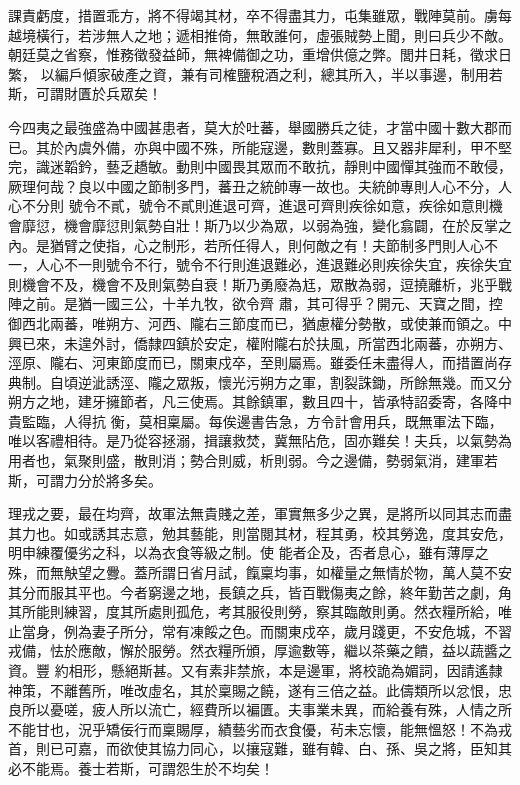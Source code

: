 \begin{pinyinscope}
 課責虧度，措置乖方，將不得竭其材，卒不得盡其力，屯集雖眾，戰陣莫前。虜每越境橫行，若涉無人之地；遞相推倚，無敢誰何，虛張賊勢上聞，則曰兵少不敵。朝廷莫之省察，惟務徵發益師，無裨備御之功，重增供億之弊。閭井日耗，徵求日繁，
 以編戶傾家破產之資，兼有司榷鹽稅酒之利，總其所入，半以事邊，制用若斯，可謂財匱於兵眾矣！



 今四夷之最強盛為中國甚患者，莫大於吐蕃，舉國勝兵之徒，才當中國十數大郡而已。其於內虞外備，亦與中國不殊，所能寇邊，數則蓋寡。且又器非犀利，甲不堅完，識迷韜鈐，藝乏趫敏。動則中國畏其眾而不敢抗，靜則中國憚其強而不敢侵，厥理何哉？良以中國之節制多門，蕃丑之統帥專一故也。夫統帥專則人心不分，人心不分則
 號令不貳，號令不貳則進退可齊，進退可齊則疾徐如意，疾徐如意則機會靡愆，機會靡愆則氣勢自壯！斯乃以少為眾，以弱為強，變化翕闢，在於反掌之內。是猶臂之使指，心之制形，若所任得人，則何敵之有！夫節制多門則人心不一，人心不一則號令不行，號令不行則進退難必，進退難必則疾徐失宜，疾徐失宜則機會不及，機會不及則氣勢自衰！斯乃勇廢為尪，眾散為弱，逗撓離析，兆乎戰陣之前。是猶一國三公，十羊九牧，欲令齊
 肅，其可得乎？開元、天寶之間，控御西北兩蕃，唯朔方、河西、隴右三節度而已，猶慮權分勢散，或使兼而領之。中興已來，未遑外討，僑隸四鎮於安定，權附隴右於扶風，所當西北兩蕃，亦朔方、涇原、隴右、河東節度而已，關東戍卒，至則屬焉。雖委任未盡得人，而措置尚存典制。自頃逆泚誘涇、隴之眾叛，懷光污朔方之軍，割裂誅鋤，所餘無幾。而又分朔方之地，建牙擁節者，凡三使焉。其餘鎮軍，數且四十，皆承特詔委寄，各降中貴監臨，人得抗
 衡，莫相稟屬。每俟邊書告急，方令計會用兵，既無軍法下臨，唯以客禮相待。是乃從容拯溺，揖讓救焚，冀無阽危，固亦難矣！夫兵，以氣勢為用者也，氣聚則盛，散則消；勢合則威，析則弱。今之邊備，勢弱氣消，建軍若斯，可謂力分於將多矣。



 理戎之要，最在均齊，故軍法無貴賤之差，軍實無多少之異，是將所以同其志而盡其力也。如或誘其志意，勉其藝能，則當閱其材，程其勇，校其勞逸，度其安危，明申練覆優劣之科，以為衣食等級之制。使
 能者企及，否者息心，雖有薄厚之殊，而無觖望之釁。蓋所謂日省月試，餼稟均事，如權量之無情於物，萬人莫不安其分而服其平也。今者窮邊之地，長鎮之兵，皆百戰傷夷之餘，終年勤苦之劇，角其所能則練習，度其所處則孤危，考其服役則勞，察其臨敵則勇。然衣糧所給，唯止當身，例為妻子所分，常有凍餒之色。而關東戍卒，歲月踐更，不安危城，不習戎備，怯於應敵，懈於服勞。然衣糧所頒，厚逾數等，繼以茶藥之饋，益以蔬醬之資。豐
 約相形，懸絕斯甚。又有素非禁旅，本是邊軍，將校詭為媚詞，因請遙隸神策，不離舊所，唯改虛名，其於稟賜之饒，遂有三倍之益。此儔類所以忿恨，忠良所以憂嗟，疲人所以流亡，經費所以褊匱。夫事業未異，而給養有殊，人情之所不能甘也，況乎矯佞行而稟賜厚，績藝劣而衣食優，茍未忘懷，能無慍怒！不為戎首，則已可嘉，而欲使其協力同心，以攘寇難，雖有韓、白、孫、吳之將，臣知其必不能焉。養士若斯，可謂怨生於不均矣！




\end{pinyinscope}
